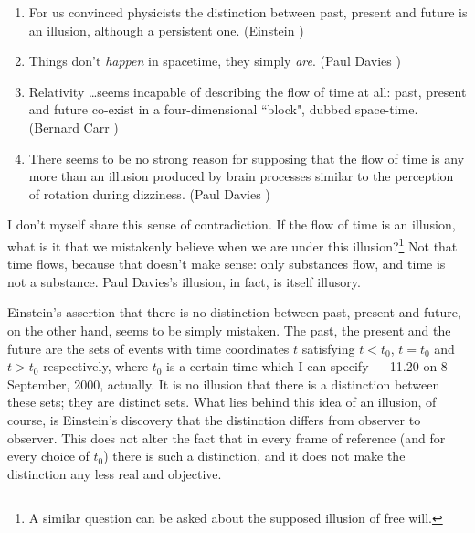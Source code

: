 \documentclass[12pt,a4paper,reqno]{article}
\renewcommand{\(}{\left(}
\renewcommand{\)}{\right)}
\newcommand{\<}{\langle}
\renewcommand{\>}{\rangle}
\theoremstyle{plain} %
\theoremstyle{definition}
\theoremstyle{remark}
\begin{document}
\begin{enumerate} \item \label{Einstein} For us convinced physicists the
distinction between past, present and future is an illusion, although a
persistent one. (Einstein \cite{Einstein:time})

\item \label{Davies1} Things don't \emph{happen} in spacetime, they
simply \emph{are}. (Paul Davies \cite{Davies:otherworlds})

\item \label{Carr} Relativity \ldots seems incapable of describing the
flow of time at all: past, present and future co-exist in a
four-dimensional ``block", dubbed space-time. (Bernard Carr \cite{Carr})

\item \label{Davies2} There seems to be no strong reason for supposing
that the flow of time is any more than an illusion produced by brain
processes similar to the perception of rotation during dizziness. (Paul
Davies \cite{Davies:otherworlds})

\end{enumerate}

I don't myself share this sense of contradiction. If the flow of time is
an illusion, what is it that we mistakenly believe when we are under
this illusion?\footnote{A similar question can be asked about the
supposed illusion of free will.} Not that time flows, because that
doesn't make sense: only substances flow, and time is not a substance.
Paul Davies's illusion, in fact, is itself illusory. 

Einstein's assertion that there is no distinction between past, present
and future, on the other hand, seems to be simply mistaken.%
The past, the present and the future are the sets
of events with time coordinates $t$ satisfying $t<t_0$, $t=t_0$ and
$t>t_0$ respectively, where $t_0$ is a certain time which I can specify
--- 11.20 on 8 September, 2000, actually. It is no illusion that there
is a distinction between these sets; they are distinct sets. What lies
behind this idea of an illusion, of course, is Einstein's discovery that
the distinction differs from observer to observer. This does not alter
the fact that in every frame of reference (and for every choice of
$t_0$) there is such a distinction, and it does not make the distinction
any less real and objective. 
\end{document}
